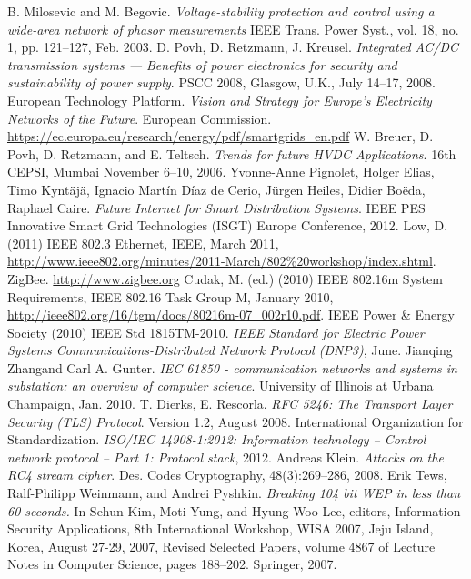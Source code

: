 \documentclass[11pt,oneside]{book}
\begin{document}
\begin{thebibliography}{99}
 B. Milosevic and M. Begovic. \emph{Voltage-stability protection and control using a wide-area network of phasor measurements} IEEE Trans. Power Syst., vol. 18, no. 1, pp. 121–127, Feb. 2003. 
 D. Povh, D. Retzmann, J. Kreusel. \emph{Integrated AC/DC transmission systems — Benefits of power electronics for security and sustainability of power supply}. PSCC 2008, Glasgow, U.K., July 14–17, 2008. 
 European Technology Platform. \emph{Vision and Strategy for Europe’s Electricity Networks of the Future}. European Commission. \url{https://ec.europa.eu/research/energy/pdf/smartgrids_en.pdf}
 W. Breuer, D. Povh, D. Retzmann, and E. Teltsch. \emph{Trends for future HVDC Applications}. 16th CEPSI, Mumbai November 6–10, 2006.
 Yvonne-Anne Pignolet, Holger Elias, Timo Kyntäjä, Ignacio Martín Díaz de Cerio, Jürgen Heiles, Didier Boëda, Raphael Caire. \emph{Future Internet for Smart Distribution Systems}. IEEE PES Innovative Smart Grid Technologies (ISGT) Europe Conference, 2012.
 Low, D. (2011) IEEE 802.3 Ethernet, IEEE, March 2011, \url{http://www.ieee802.org/minutes/2011-March/802\%20workshop/index.shtml}.
 ZigBee. \url{http://www.zigbee.org}
 Cudak, M. (ed.) (2010) IEEE 802.16m System Requirements, IEEE 802.16 Task Group M, January 2010, \url{http://ieee802.org/16/tgm/docs/80216m-07_002r10.pdf}.
 IEEE Power \& Energy Society (2010) IEEE Std 1815TM-2010. \emph{IEEE Standard for Electric Power Systems Communications-Distributed Network Protocol (DNP3)}, June.
 Jianqing Zhangand Carl A. Gunter. \emph{IEC 61850 - communication networks and systems in substation: an overview of computer science}.
University of Illinois at Urbana Champaign, Jan. 2010.
 T. Dierks, E. Rescorla. \emph{RFC 5246: The Transport Layer Security (TLS) Protocol}. Version 1.2, August 2008.
 International Organization for Standardization. \emph{ISO/IEC 14908-1:2012: Information technology – Control network protocol – Part 1: Protocol stack}, 2012.
 Andreas Klein. \emph{Attacks on the RC4 stream cipher}. Des. Codes Cryptography, 48(3):269–286, 2008.
 Erik Tews, Ralf-Philipp Weinmann, and Andrei Pyshkin. \emph{Breaking 104 bit WEP in less than 60 seconds.} In Sehun Kim, Moti Yung, and Hyung-Woo Lee, editors, Information Security Applications, 8th International Workshop, WISA 2007, Jeju Island, Korea, August 27-29, 2007, Revised Selected Papers, volume 4867 of Lecture Notes in Computer Science, pages 188–202. Springer, 2007.

\end{thebibliography}
\end{document}
